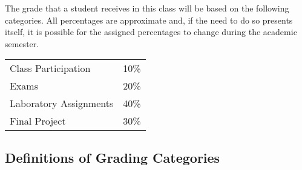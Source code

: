 \documentclass[11pt]{article} %
\begin{document}
The grade that a student receives in this class will be based on the following categories. All percentages are approximate and, if the need to do so presents itself, it is possible for the assigned percentages to change during the academic semester. 
\color{red}
\begin{center}
  \begin{tabular}{l|l}
\hline
    Class Participation & 10\% \\  %
    Exams & 20\% \\
    Laboratory  Assignments & 40\% \\
    Final Project & 30\% \\
\hline
  \end{tabular}
\end{center}
\color{black}
\noindent

\noindent
\subsection*{\textbf{Definitions of Grading Categories}}
\vspace*{-.05in}
\end{document}
